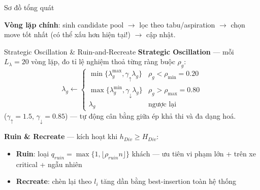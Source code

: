 \documentclass[aspectratio=169]{beamer}
\newcommand{\hl}[1]{\textcolor{blue!60!black}{\textbf{#1}}}
\begin{document}
\begin{frame}{Sơ đồ tổng quát}
\begin{center}
{%
  }
  \end{center}

  \small
  \hl{Vòng lặp chính}:
  sinh candidate pool
  $\to$ lọc theo tabu/aspiration
  $\to$ chọn move tốt nhất
  (có thể xấu hơn hiện tại!)
  $\to$ cập nhật.
\end{frame}

\begin{frame}{Strategic Oscillation \& Ruin-and-Recreate}
  \textbf{Strategic Oscillation} — mỗi $L_\lambda = 20$ vòng lặp, đo tỉ lệ nghiệm thoả từng ràng buộc $\rho_g$:
  $$
  \lambda_g \leftarrow
  \begin{cases}
    \min\{\lambda_g^{\max}, \gamma_\uparrow \lambda_g\} & \rho_g < \rho_{\min}=0.20 \\
    \max\{\lambda_g^{\min}, \gamma_\downarrow \lambda_g\} & \rho_g > \rho_{\max}=0.80 \\
    \lambda_g & \text{ngược lại}
  \end{cases}
  $$
  ($\gamma_\uparrow = 1.5$, $\gamma_\downarrow = 0.85$) — tự động cân bằng giữa ép khả thi và đa dạng hoá.

  \vspace{3mm}
  \textbf{Ruin \& Recreate} — kích hoạt khi $h_{Div} \ge H_{Div}$:
  \begin{itemize}
    \item \textbf{Ruin}: loại $q_{ruin} = \max\{1, \lfloor \rho_{ruin} n \rfloor\}$ khách — ưu tiên vi phạm lớn + trên xe critical + ngẫu nhiên
    \item \textbf{Recreate}: chèn lại theo $l_i$ tăng dần bằng best-insertion toàn hệ thống
  \end{itemize}
\end{frame}
\end{document}
